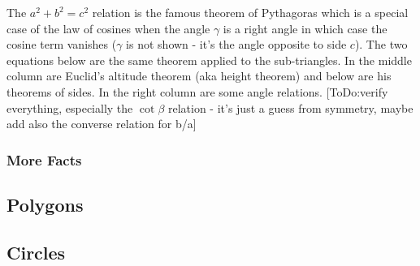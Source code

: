 The $a^2 + b^2 = c^2$ relation is the famous theorem of Pythagoras which is a special case of the law of cosines when the angle $\gamma$ is a right angle in which case the cosine term vanishes ($\gamma$ is not shown - it's the angle opposite to side $c$). The two equations below are the same theorem applied to the sub-triangles. In the middle column are Euclid's altitude theorem (aka height theorem) and below are his theorems of sides. In the right column are some angle relations. [ToDo:verify everything, especially the $\cot \beta$ relation - it's just a guess from symmetry, maybe add also the converse relation for b/a] 





\subsubsection{More Facts}

\subsection{Polygons}

\subsection{Circles}

